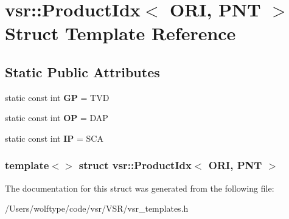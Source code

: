\hypertarget{structvsr_1_1_product_idx_3_01_o_r_i_00_01_p_n_t_01_4}{\section{vsr\-:\-:Product\-Idx$<$ O\-R\-I, P\-N\-T $>$ Struct Template Reference}
\label{structvsr_1_1_product_idx_3_01_o_r_i_00_01_p_n_t_01_4}
}
\subsection*{Static Public Attributes}
\begin{DoxyCompactItemize}
\item 
\hypertarget{structvsr_1_1_product_idx_3_01_o_r_i_00_01_p_n_t_01_4_aad86a9c48ac7ab8563463e4b3bd21f04}{static const int {\bfseries G\-P} = T\-V\-D}\label{structvsr_1_1_product_idx_3_01_o_r_i_00_01_p_n_t_01_4_aad86a9c48ac7ab8563463e4b3bd21f04}

\item 
\hypertarget{structvsr_1_1_product_idx_3_01_o_r_i_00_01_p_n_t_01_4_a3f671c2f9652fbfd4589e4727b0b3a3f}{static const int {\bfseries O\-P} = D\-A\-P}\label{structvsr_1_1_product_idx_3_01_o_r_i_00_01_p_n_t_01_4_a3f671c2f9652fbfd4589e4727b0b3a3f}

\item 
\hypertarget{structvsr_1_1_product_idx_3_01_o_r_i_00_01_p_n_t_01_4_aa37317b3c56ca634b1c38976d42753f2}{static const int {\bfseries I\-P} = S\-C\-A}\label{structvsr_1_1_product_idx_3_01_o_r_i_00_01_p_n_t_01_4_aa37317b3c56ca634b1c38976d42753f2}

\end{DoxyCompactItemize}
\subsubsection*{template$<$$>$ struct vsr\-::\-Product\-Idx$<$ O\-R\-I, P\-N\-T $>$}



The documentation for this struct was generated from the following file\-:\begin{DoxyCompactItemize}
\item 
/\-Users/wolftype/code/vsr/\-V\-S\-R/vsr\-\_\-templates.\-h\end{DoxyCompactItemize}
